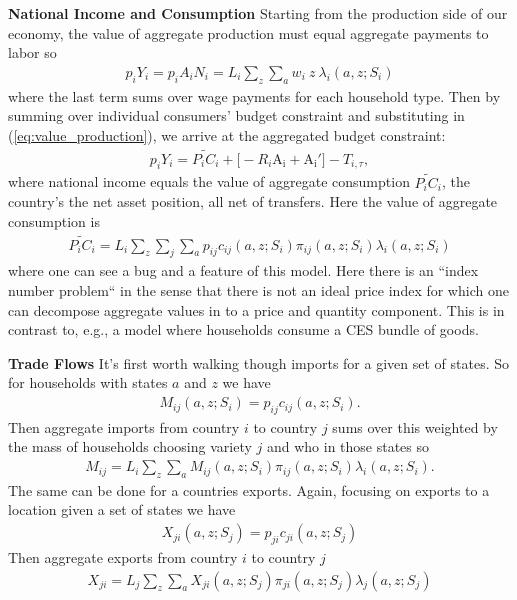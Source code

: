 \documentclass[12pt,pdftex]{article}
\begin{document}
\begin{onehalfspacing}
\textbf{National Income and Consumption} Starting from the production side of our economy, the value of aggregate production must equal aggregate payments to labor so
\begin{align}
p_{i} Y_{i} = p_{i} A_{i} N_{i} = L_i \sum_{z} \sum_{a} w_{i} \ z \ \lambda_i(a, z; S_i)
\label{eq:value_production}
\end{align}
where the last term sums over wage payments for each household type. Then by summing over individual consumers' budget constraint and substituting in (\ref{eq:value_production}), we arrive at the aggregated budget constraint:
\begin{align}
p_{i} Y_{i}  = \widetilde{P_{i} C_i}  + \bigg[-R_i\mathrm{A_i} +  \mathrm{A_i'} \bigg] - T_{i,\tau},
\label{eq:aggregate_budget_constraint}
\end{align}
where national income equals the value of aggregate consumption $\widetilde{P_{i} C_i}$, the country's the net asset position, all net of transfers. Here the value of aggregate consumption is
\begin{align}
\widetilde{P_{i} C_i} = L_{i} \sum_{z}\sum_{j}\sum_{a}  p_{ij} c_{ij}(a, z; S_i) \pi_{ij}(a, z; S_i) \lambda_i(a, z; S_i)
\end{align}
where one can see a bug and a feature of this model. Here there is an ``index number problem`` in the sense that there is not an ideal price index for which one can decompose aggregate values in to a price and quantity component. This is in contrast to, e.g., a model where households consume a CES bundle of goods.

\textbf{Trade Flows} It's first worth walking though imports for a given set of states. So for households with states $a$ and $z$ we have
\begin{align}
M_{ij}(a, z; S_i) = p_{ij} c_{ij}(a, z; S_i).
\end{align}
Then aggregate imports from country $i$ to country $j$ sums over this weighted by the mass of households choosing variety $j$ and who in those states so
\begin{align}
M_{ij} = L_i \sum_{z}\sum_{a} M_{ij}(a, z; S_i) \pi_{ij}(a, z; S_i) \lambda_i(a, z; S_i).
\label{eq:imports}
\end{align}
The same can be done for a countries exports. Again, focusing on exports to a location given a set of states we have
\begin{align}
X_{ji}(a, z; S_j) = p_{ji} c_{ji}(a, z; S_j)
\end{align}
Then aggregate exports from country $i$ to country $j$
\begin{align}
X_{ji} = L_j \sum_{z}\sum_{a} X_{ji}(a, z; S_j) \pi_{ji}(a, z; S_j) \lambda_j(a, z; S_j)
\label{eq:exports}
\end{align}


\end{onehalfspacing}
\end{document}
